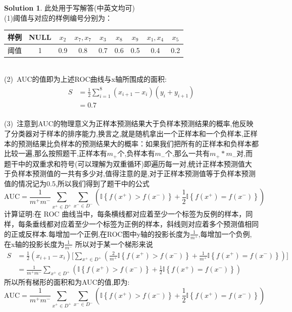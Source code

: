\documentclass[a4paper,UTF8]{article}
\numberwithin{equation}{section}
\theoremstyle{definition}
\newtheorem*{solution}{Solution}
\begin{document}
\begin{solution}
此处用于写解答(中英文均可)
~\\(1)阈值与对应的样例编号分别为：
\begin{table}[ht]
	\centering
	\begin{tabular}{c|cccccccc}
		\hline 样例 & NULL & $x_2$ & $x_7,x_7$ & $x_3$ & $x_8$ & $x_9$ & $x_1,x_4$ & $x_5$\\
		\hline 阈值 & 1 & 0.9 & 0.8 & 0.7 & 0.6 & 0.5 & 0.4 & 0.2  \\
		\hline
	\end{tabular}
\end{table} 
~\\(2)\ AUC的值即为上述ROC曲线与x轴所围成的面积:
	\[
		\begin{split}
		S &=\frac{1}{2} \sum_{i=1}^8(x_{i+1}-x_i)(y_i+y_{i+1})\\
		&=0.7
		\end{split}
	\]
~\\(3)\ 注意到AUC的物理意义为正样本预测结果大于负样本预测结果的概率,他反映了分类器对于样本的排序能力,换言之,就是随机拿出一个正样本和一个负样本,正样本的预测结果比负样本的预测结果大的概率：如果我们把所有的正样本和负样本都比较一遍,那么按照题干,正样本有$m_+$个,负样本有$m_-$个,那么一共有$m_+ * m_-$对,而题干中的双重求和符号(可以理解为双重循环)即遍历每一对,统计正样本预测值大于负样本预测值的一共有多少对,值得注意的是,对于正样本预测值等于负样本预测值的情况记为0.5,所以我们得到了题干中的公式\[\text{AUC} = \frac{1}{m^+m^-}\sum_{x^+\in D^+}\sum_{x^-\in D^-}\left(\mathbb{I}\left\{f(x^+) > f(x^-)\right\}+\frac{1}{2}\mathbb{I}\left\{f(x^+)=f(x^-)\right\}\right)\]
计算证明:在 ROC 曲线当中，每条横线都对应着至少一个标签为反例的样本，同样，每条垂线都对应着至少一个标签为正例的样本，斜线则对应着多个预测值相同的正或反样本.每增加一个正例,在ROC图中y轴的投影长度为$\frac{1}{m^+}$,每增加一个负例,在x轴的投影长度为$\frac{1}{m^-}$
所以对于某一个梯形来说
\[
	\begin{split}
	S&=\frac{1}{2}(x_{i+1}-x_i)\big[\sum_{x^+\in D^+}( \frac{2}{m^+}\mathbb{I}\left\{f(x^+) > f(x^-)\right\}+\frac{1}{m^+}\mathbb{I}\left\{f(x^+) = f(x^-)\right\} ) \big]\\
	&=\frac{1}{m^+m^-}\sum_{x^+\in D^+}\left(\mathbb{I}\left\{f(x^+) > f(x^-)\right\}+\frac{1}{2}\mathbb{I}\left\{f(x^+)=f(x^-)\right\}\right)
	\end{split}
\]
所以所有梯形的面积和为AUC的值,即为:\[
	\text{AUC} = \frac{1}{m^+m^-}\sum_{x^+\in D^+}\sum_{x^-\in D^-}\left(\mathbb{I}\left\{f(x^+) > f(x^-)\right\}+\frac{1}{2}\mathbb{I}\left\{f(x^+)=f(x^-)\right\}\right)
\]
\end{solution}
\newpage
\end{document}
